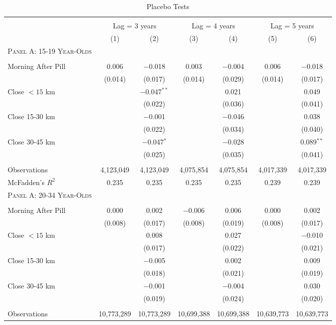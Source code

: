 \begin{landscape}
\begin{table}[!htbp] \centering
\caption{Placebo Tests}
\label{TEENtab:Placebo}
\begin{tabular}{lcccccc}
\\[-1.8ex]\hline \hline \\[-1.8ex] 
&\multicolumn{2}{c}{Lag = 3 years}
&\multicolumn{2}{c}{Lag = 4 years}
&\multicolumn{2}{c}{Lag = 5 years}
\\ \cmidrule(r){2-3} \cmidrule(r){4-5} \cmidrule(r){6-7}
&(1)&(2)&(3)&(4)&(5)&(6)\\ \hline
\textsc{Panel A: 15-19 Year-Olds} &&&&&& \\
 & & & & & & \\
Morning After Pill &0.006&$-$0.018&0.003&$-$0.004&0.006&$-$0.018\\
&(0.014)&(0.017)&(0.014)&(0.029)&(0.014)&(0.017)\\
Close $<15$ km &&$-$0.047$^{**}$&& 0.021&&0.049\\
&&(0.022)&&(0.036)&&(0.041)\\
Close 15-30 km &&$-$0.001&&$-$0.046&&0.038\\
&&(0.022)&&(0.034)&&(0.040)\\
Close 30-45 km &&$-$0.047$^{*}$&&$-$0.028&&0.089$^{**}$\\
&&(0.025)&&(0.035)&&(0.041)\\
 & & & & & & \\
Observations&4,123,049&4,123,049&4,075,854&4,075,854&4,017,339&4,017,339\\
McFadden's $R^2$&0.235&0.235&0.235&0.235&0.239&0.239\\ \midrule
\textsc{Panel A: 20-34 Year-Olds} &&&&&& \\
 & & & & & & \\
Morning After Pill &0.000& 0.002&$-$0.006& 0.006&0.000& 0.002\\
&(0.008)&(0.017)&(0.008)&(0.019)&(0.008)&(0.017)\\
Close $<15$ km && 0.008&& 0.027&&$-$0.010\\
&&(0.017)&&(0.022)&&(0.021)\\
Close 15-30 km &&$-$0.005&& 0.002&& 0.009\\
&&(0.018)&&(0.021)&&(0.019)\\
Close 30-45 km &&$-$0.001&&$-$0.004&& 0.030\\
&&(0.019)&&(0.024)&&(0.020)\\
 & & & & & & \\
Observations&10,773,289&10,773,289&10,699,388&10,699,388&10,639,773&10,639,773\\

\end{tabular}
\end{table}
\end{landscape}
